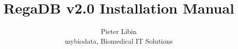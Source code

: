 \documentclass[12pt,makeidx]{phdthesis}
\begin{document}
\title{RegaDB v2.0 Installation Manual}
\author{Pieter Libin\\mybiodata, Biomedical IT Solutions}
\maketitle

\cleardoublepage
\lhead[]{\fancyplain{}{\rightmark}}
\chead[\fancyplain{}{}]{\fancyplain{}{}}
\rhead[\fancyplain{}{\leftmark}]{\fancyplain{}{}}

\setcounter{tocdepth}{2}
\tableofcontents

{}
%

\cleardoublepage

\newcommand{\publ}{}

\pagestyle{fancyplain}
\renewcommand{\sectionmark}[1]{\markright{\it \thesection.\ #1}}
\renewcommand{\chaptermark}[1]{\markboth{
       \it \thechapter.\ #1}{}}
\lhead[\thepage]{\fancyplain{\publ}{\rightmark}}
\chead[\fancyplain{}{}]{\fancyplain{}{}}
\rhead[\fancyplain{}{\leftmark}]{\fancyplain{}{\thepage}}
\lfoot[]{}
\cfoot[]{}
\rfoot[]{}



%



\end{document}

